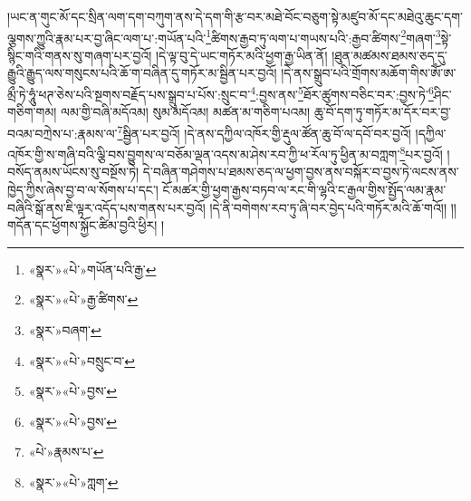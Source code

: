 །ཡང་ན་གུང་མོ་དང་སྲིན་ལག་དག་བཀུག་ནས་དེ་དག་གི་རྩ་བར་མཐེ་བོང་བཅུག་སྟེ་མཛུབ་མོ་དང་མཐེའུ་ཆུང་དག་ལྕགས་ཀྱུའི་རྣམ་པར་བྱ་ཞིང་ལག་པ་:གཡོན་པའི་\footnote{«སྣར་»«པེ་»གཡོན་པའི་རྒྱ་}ཚིགས་རྒྱབ་ཏུ་ལག་པ་གཡས་པའི་:རྒྱབ་ཚིགས་\footnote{«སྣར་»«པེ་»རྒྱ་ཚིགས་}གཞག་\footnote{«སྣར་»བཞག་}སྟེ་སྙིང་གའི་གནས་སུ་གཞག་པར་བྱའོ། །དེ་ལྟ་བུ་དེ་ཡང་གཏོར་མའི་ཕྱག་རྒྱ་ཡིན་ནོ། །ཐུན་མཚམས་ཐམས་ཅད་དུ་རྒྱུའི་རྒྱུད་ལས་གསུངས་པའི་ཆོ་ག་བཞིན་དུ་གཏོར་མ་སྦྱིན་པར་བྱའོ། །དེ་ནས་སྒྲུབ་པའི་གྲོགས་མཆོག་གིས་ཨོཾ་ཨ་མྲྀ་ཏེ་ཧཱུཾ་ཕཊ་ཅེས་པའི་སྔགས་བརྗོད་པས་སྒྲུབ་པ་པོས་:སྲུང་བ་\footnote{«སྣར་»«པེ་»བསྲུང་བ་}:བྱས་ནས་\footnote{«སྣར་»«པེ་»བྱས་}ཐོར་ཚུགས་བཅིང་བར་:བྱས་ཏེ་\footnote{«སྣར་»«པེ་»བྱས་}ཤིང་གཅིག་གམ། ལམ་གྱི་བཞི་མདོའམ། སུམ་མདོའམ། མཚན་མ་གཅིག་པའམ། ཆུ་བོ་དག་ཏུ་གཏོར་མ་དོར་བར་བྱ་བའམ་བཀྲེས་པ་:རྣམས་ལ་\footnote{«པེ་»རྣམས་པ་}སྦྱིན་པར་བྱའོ། །དེ་ནས་དཀྱིལ་འཁོར་གྱི་རྡུལ་ཚོན་ཆུ་བོ་ལ་དབོ་བར་བྱའོ། །དཀྱིལ་འཁོར་གྱི་ས་གཞི་བའི་ལྕི་བས་བྱུགས་ལ་བཅོམ་ལྡན་འདས་མ་ཤེས་རབ་ཀྱི་ཕ་རོལ་ཏུ་ཕྱིན་མ་བཀླག་\footnote{«སྣར་»«པེ་»ཀླག་}པར་བྱའོ། །བསོད་ནམས་ཡོངས་སུ་བསྔོས་ཏེ། དེ་བཞིན་གཤེགས་པ་ཐམས་ཅད་ལ་ཕྱག་བྱས་ནས་བསྐོར་བ་བྱས་ཏེ་ལངས་ནས་ཁྱེད་ཀྱིས་ཞེས་བྱ་བ་ལ་སོགས་པ་དང་། ངོ་མཚར་གྱི་ཕྱག་རྒྱས་བཏབ་ལ་རང་གི་ལྷའི་ང་རྒྱལ་གྱིས་སྤྱོད་ལམ་རྣམ་བཞིའི་སྒོ་ནས་ཇི་ལྟར་འདོད་པས་གནས་པར་བྱའོ། །དེ་ནི་བགེགས་རབ་ཏུ་ཞི་བར་བྱེད་པའི་གཏོར་མའི་ཆོ་གའོ།། །།གདོན་དང་ཕྱོགས་སྐྱོང་ཚིམ་བྱའི་ཕྱིར། །
